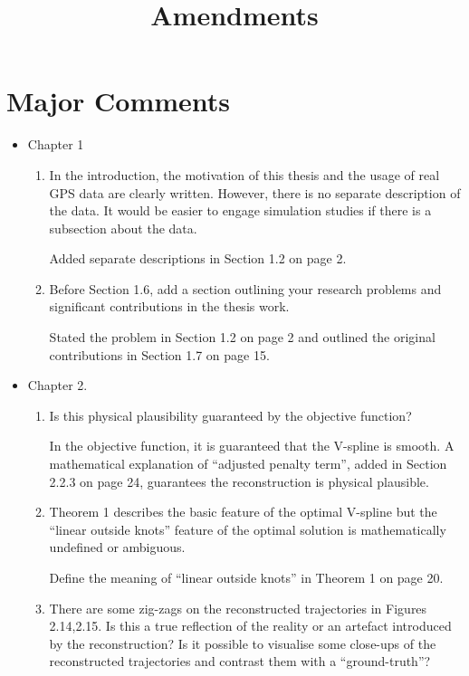 \documentclass[a4paper,18pt]{extarticle}
\title{Amendments}
\date{}							%
\begin{document}
\maketitle


\section{Major Comments}

\begin{itemize}
	\item Chapter 1
	\begin{enumerate}
	\item In the introduction, the motivation of this thesis and the usage of real GPS data are clearly written. However, there is no separate description of the data. It would be easier to engage simulation studies if there is a subsection about the data.
	
	Added separate descriptions in Section 1.2 on page 2.
	
	\item Before Section 1.6, add a section outlining your research problems and significant contributions in the thesis work.
	
	Stated the problem in Section 1.2 on page 2 and outlined the original contributions in Section 1.7 on page 15.
	\end{enumerate}

	
	\item  Chapter 2. 
	\begin{enumerate}
	\item Is this physical plausibility guaranteed by the objective function?
	
	In the objective function, it is guaranteed that the V-spline is smooth. A mathematical explanation of ``adjusted penalty term'', added in Section 2.2.3 on page 24, guarantees the reconstruction is physical plausible. 
	
	\item Theorem 1 describes the basic feature of the optimal V-spline but the ``linear outside knots'' feature of the optimal solution is mathematically undefined or ambiguous. 
	
	Define the meaning of ``linear outside knots'' in Theorem 1 on page 20.
	
	\item There are some zig-zags on the reconstructed trajectories in Figures 2.14,2.15. Is this a true reflection of the reality or an artefact introduced by the reconstruction? Is it possible to visualise some close-ups of the reconstructed trajectories and contrast them with a ``ground-truth''?
	

\end{enumerate}
\end{itemize}
\end{document}
